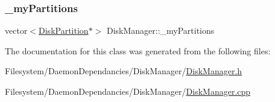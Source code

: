 \subsubsection{\texorpdfstring{\+\_\+my\+Partitions}{\_myPartitions}}
{\footnotesize\ttfamily vector$<$\mbox{\hyperlink{struct_disk_partition}{Disk\+Partition}}$\ast$$>$ Disk\+Manager\+::\+\_\+my\+Partitions\hspace{0.3cm}{\ttfamily [private]}}



The documentation for this class was generated from the following files\+:\begin{DoxyCompactItemize}
\item 
Filesystem/\+Daemon\+Dependancies/\+Disk\+Manager/\mbox{\hyperlink{_disk_manager_8h}{Disk\+Manager.\+h}}\item 
Filesystem/\+Daemon\+Dependancies/\+Disk\+Manager/\mbox{\hyperlink{_disk_manager_8cpp}{Disk\+Manager.\+cpp}}\end{DoxyCompactItemize}

